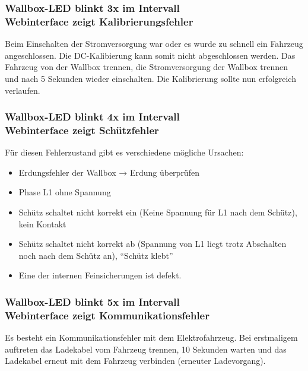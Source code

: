 \documentclass[a4paper,10pt]{article}
\begin{document}
\begin{multicols*}{2}
	\subsubsection*{Wallbox-LED blinkt 3x im Intervall \\ Webinterface zeigt Kalibrierungsfehler}
	Beim Einschalten der Stromversorgung war oder es wurde zu schnell ein
	Fahrzeug angeschlossen. Die DC-Kalibierung kann somit nicht abgeschlossen
	werden. Das Fahrzeug von der Wallbox trennen, die Stromversorgung der Wallbox
	trennen und nach 5 Sekunden wieder einschalten. Die Kalibrierung sollte nun
	erfolgreich verlaufen.

	\subsubsection*{Wallbox-LED blinkt 4x im Intervall \\ Webinterface zeigt Schützfehler}
	Für diesen Fehlerzustand gibt es verschiedene mögliche Ursachen:
	\begin{itemize}
		\item Erdungsfehler der Wallbox → Erdung überprüfen
		\item Phase L1 ohne Spannung
		\item Schütz schaltet nicht korrekt ein (Keine Spannung für L1 nach dem Schütz), kein
		      Kontakt
		\item Schütz schaltet nicht korrekt ab (Spannung von L1 liegt trotz Abschalten noch
		      nach dem Schütz an), \enquote{Schütz klebt}
		\item Eine der internen Feinsicherungen ist defekt.
	\end{itemize}

	\subsubsection*{Wallbox-LED blinkt 5x im Intervall \\ Webinterface zeigt Kommunikationsfehler}
	Es besteht ein Kommunikationsfehler mit dem Elektrofahrzeug. Bei erstmaligem
	auftreten das Ladekabel vom Fahrzeug trennen, 10 Sekunden warten und das
	Ladekabel erneut mit dem Fahrzeug verbinden (erneuter Ladevorgang).


\end{multicols*}
\end{document}
